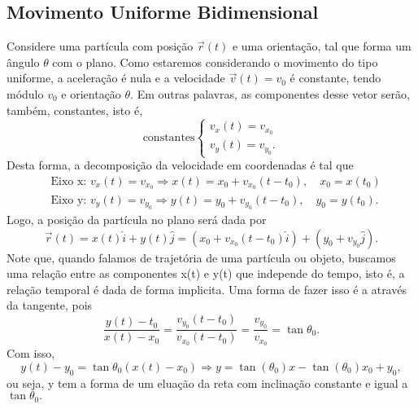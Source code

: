 \documentclass[physics_notes.tex]{subfiles}
\begin{document}
\subsection{Movimento Uniforme Bidimensional}
Considere uma partícula com posição $\vec{r}(t)$ e uma orientação, tal que forma um ângulo $\theta$ com o plano. Como
estaremos considerando o movimento do tipo uniforme, a aceleração é nula e a velocidade $\vec{v}(t) = v_{0}$ é constante,
tendo módulo $v_{0}$ e orientação $\theta$. Em outras palavras, as componentes desse vetor serão, também, constantes, isto é,
$$
	\text{constantes}\left\{\begin{array}{ll}
		v_{x}(t) = v_{x_{0}} \\
		v_{y}(t) = v_{y_{0}}.
	\end{array}\right.
$$
Desta forma, a decomposição da velocidade em coordenadas é tal que
\begin{align*}
	 & \text{Eixo x: }v_{x}(t) = v_{x_{0}} \Rightarrow x(t) = x_{0} + v_{x_{0}}(t-t_{0}),\quad x_{0} = x(t_{0})  \\
	 & \text{Eixo y: }v_{y}(t) = v_{y_{0}} \Rightarrow y(t) = y_{0} + v_{y_{0}}(t-t_{0}),\quad y_{0} = y(t_{0}).
\end{align*}
Logo, a posição da partícula no plano será dada por
$$
	\vec{r}(t) = x(t)\hat{i} + y(t)\hat{j} = (x_{0} + v_{x_{0}}(t-t_{0})\hat{i}) + (y_{0} + v_{y_{0}}\hat{j}).
$$
Note que, quando falamos de trajetória de uma partícula ou objeto, buscamos uma relação entre as componentes x(t) e y(t) que
independe do tempo, isto é, a relação temporal é dada de forma implicita. Uma forma de fazer isso é a através da tangente, pois
$$
	\frac{y(t) - t_{0}}{x(t) - x_{0}} = \frac{v_{y_{0}}(t-t_{0})}{v_{x_{0}}(t-t_{0})} = \frac{v_{y_{0}}}{v_{x_{0}}} = \tan{\theta_{0}}.
$$
Com isso,
$$
	y(t) - y_{0} = \tan{\theta_{0}}(x(t)-x_{0}) \Rightarrow y = \tan{(\theta_{0})}x - \tan{(\theta_{0})}x_{0} + y_{0},
$$
ou seja, y tem a forma de um eluação da reta com inclinação constante e igual a $\tan{\theta_{0}}.$
\end{document}
